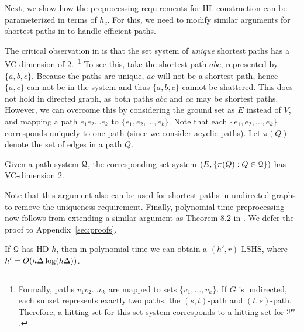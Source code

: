 Next, we show how the preprocessing requirements for HL construction can be parameterized in terms of $h_c$. For this, we need to modify similar arguments for shortest paths in \cite{highway2013} to handle efficient paths.

The critical observation in \cite{highway2013} is that the set system of \emph{unique} shortest paths has a VC-dimension of $2$.~\footnote{
Formally, paths $v_1v_2\ldots v_k$ are mapped to sets $\{v_1,\ldots,v_k\}$. If $G$ is undirected, each subset represents exactly two paths, the $(s,t)$-path and $(t,s)$-path. Therefore, a hitting set for this set system corresponds to a hitting set for $\mathcal{P}^*$.}
To see this, take the shortest path $abc$, represented by $\{a,b,c\}$. Because the paths are unique, $ac$ will not be a shortest path, hence $\{a,c\}$ can not be in the system and thus $\{a,b,c\}$ cannot be shattered.
This does not hold in directed graph, as both paths $abc$ and $ca$ may be shortest paths. However, we can overcome this by considering the ground set as $E$ instead of $V$, and mapping a path $e_1e_2\ldots e_k$ to $\{e_1,e_2,\ldots,e_k\}$.
Note that each $\{e_1,e_2,\ldots,e_k\}$ corresponds uniquely to one path (since we consider acyclic paths).
Let $\pi(Q)$ denote the set of edges in a path $Q$.
\begin{proposition}
Given a path system $\mathcal{Q}$, the corresponding set system $(E,\{\pi(Q):Q\in\mathcal{Q}\})$ has VC-dimension 2.
\end{proposition}
Note that this argument also can be used for shortest paths in undirected graphs to remove the uniqueness requirement.
Finally, polynomial-time preprocessing now follows from extending a similar argument as Theorem 8.2 in \cite{highway2013}.
We defer the proof to Appendix~\ref{sec:proofs}.

\begin{proposition}\label{prop:poly_lshs}
If $\mathcal{Q}$ has HD $h$, then in polynomial time we can obtain a $(h',r)$-LSHS, where $h'=O(h\Delta\log(h\Delta))$.	
\end{proposition}